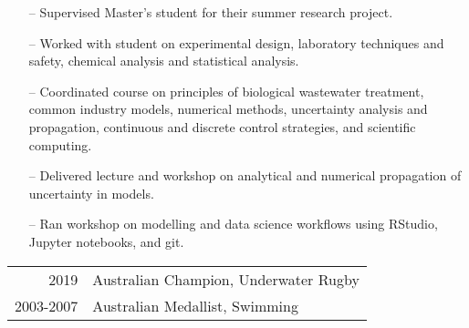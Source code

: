 \documentclass[10pt,a4paper]{altacv}
\begin{document}
\begin{itemize}
    \setlength{\itemindent}{0.3em}
    \item[--]   \small{Supervised Master's student for their summer research project.}
    \item[--]   \small{Worked with student on experimental design, laboratory techniques and safety, chemical analysis and statistical analysis.}
\end{itemize}
\divider\smallskip

\begin{itemize}
    \setlength{\itemindent}{0.3em}
    \item[--]   \small{Coordinated course on principles of biological wastewater treatment, 
    common industry models, numerical methods, 
    uncertainty analysis and propagation, 
    continuous and discrete control strategies, 
    and scientific computing.}
\end{itemize}
\divider\smallskip

\begin{itemize}
    \setlength{\itemindent}{0.3em}
    \item[--]   \small{Delivered lecture and workshop on analytical 
    and numerical propagation of uncertainty in models.}
    \item[--]   \small{Ran workshop on modelling and data science 
    workflows using RStudio, Jupyter notebooks, and git.}
\end{itemize}




\begin{tabular}{rl}
2019 & Australian Champion, Underwater Rugby \\
2003-2007 & Australian Medallist, Swimming\\
\end{tabular}







\end{document}
